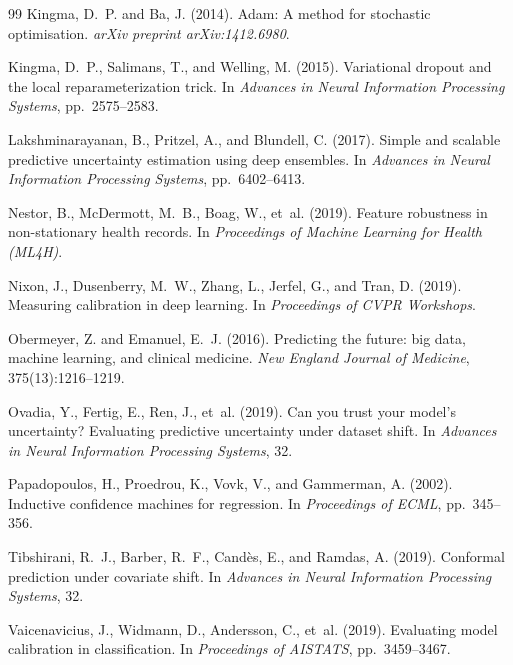 \documentclass[11pt,a4paper]{article}
\begin{document}
\begin{thebibliography}{99}
Kingma, D.~P. and Ba, J. (2014).
\newblock Adam: A method for stochastic optimisation.
\newblock \textit{arXiv preprint arXiv:1412.6980}.

Kingma, D.~P., Salimans, T., and Welling, M. (2015).
\newblock Variational dropout and the local reparameterization trick.
\newblock In \textit{Advances in Neural Information Processing Systems}, pp.~2575--2583.

Lakshminarayanan, B., Pritzel, A., and Blundell, C. (2017).
\newblock Simple and scalable predictive uncertainty estimation using deep ensembles.
\newblock In \textit{Advances in Neural Information Processing Systems}, pp.~6402--6413.

Nestor, B., McDermott, M.~B., Boag, W., et~al. (2019).
\newblock Feature robustness in non-stationary health records.
\newblock In \textit{Proceedings of Machine Learning for Health (ML4H)}.

Nixon, J., Dusenberry, M.~W., Zhang, L., Jerfel, G., and Tran, D. (2019).
\newblock Measuring calibration in deep learning.
\newblock In \textit{Proceedings of CVPR Workshops}.

Obermeyer, Z. and Emanuel, E.~J. (2016).
\newblock Predicting the future: big data, machine learning, and clinical medicine.
\newblock \textit{New England Journal of Medicine}, 375(13):1216--1219.

Ovadia, Y., Fertig, E., Ren, J., et~al. (2019).
\newblock Can you trust your model's uncertainty? Evaluating predictive uncertainty under dataset shift.
\newblock In \textit{Advances in Neural Information Processing Systems}, 32.

Papadopoulos, H., Proedrou, K., Vovk, V., and Gammerman, A. (2002).
\newblock Inductive confidence machines for regression.
\newblock In \textit{Proceedings of ECML}, pp.~345--356.

Tibshirani, R.~J., Barber, R.~F., Cand\`{e}s, E., and Ramdas, A. (2019).
\newblock Conformal prediction under covariate shift.
\newblock In \textit{Advances in Neural Information Processing Systems}, 32.

Vaicenavicius, J., Widmann, D., Andersson, C., et~al. (2019).
\newblock Evaluating model calibration in classification.
\newblock In \textit{Proceedings of AISTATS}, pp.~3459--3467.


\end{thebibliography}
\end{document}
